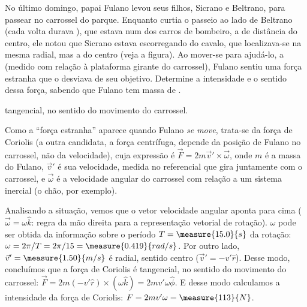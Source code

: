\begin{question}
	No último domingo, papai Fulano levou seus filhos, Sicrano e Beltrano, para passear no carrossel do parque.
	Enquanto curtia o passeio ao lado de Beltrano (cada volta durava ), que estava num dos carros de bombeiro, a  de distância do centro, ele notou que Sicrano estava escorregando do cavalo, que localizava-se na mesma radial, mas a  do centro (veja a figura).
	Ao mover-se para ajudá-lo, a  (medido com relação à plataforma girante do carrossel), Fulano sentiu uma força estranha que o desviava de seu objetivo.
	Determine a intensidade e o sentido dessa força, sabendo que Fulano tem massa de .

	\begin{answer}
		 tangencial, no sentido do movimento do carrossel.
	\end{answer}


	\begin{solution}
		Como a ``força estranha'' aparece quando Fulano \emph{se move}, trata-se da força de Coriolis (a outra candidata, a força centrífuga, depende da posição de Fulano no carrossel, não da velocidade), cuja expressão é $\vec F = 2m\vec v' \times \vec \omega$, onde $m$ é a massa do Fulano, $\vec v'$ é sua velocidade, medida no referencial que gira juntamente com o carrossel, e $\vec\omega$ é a velocidade angular do carrossel com relação a um sistema inercial (o chão, por exemplo).

		Analisando a situação, vemos que o vetor velocidade angular aponta para cima ($\vec\omega = \omega\hat k$: regra da mão direita para a representação vetorial de rotação). $\omega$ pode ser obtida da informação sobre o período $T = \measure{15.0}{s}$ da rotação: $\omega = 2\pi/T = 2\pi/15 = \measure{0.419}{rad/s}$. Por outro lado, $\vec v' = \measure{1.50}{m/s}$ é radial, sentido centro ($\vec v' = -v'\hat r$).
		Desse modo, concluímos que a força de Coriolis é tangencial, no sentido do movimento do carrossel: $\vec F = 2m(-v'\hat r)\times(\omega \hat k) = 2mv'\omega \hat \phi$. E desse modo calculamos a intensidade da força de Coriolis: $F = 2mv'\omega = \measure{113}{N}$.
	\end{solution}
\end{question}
